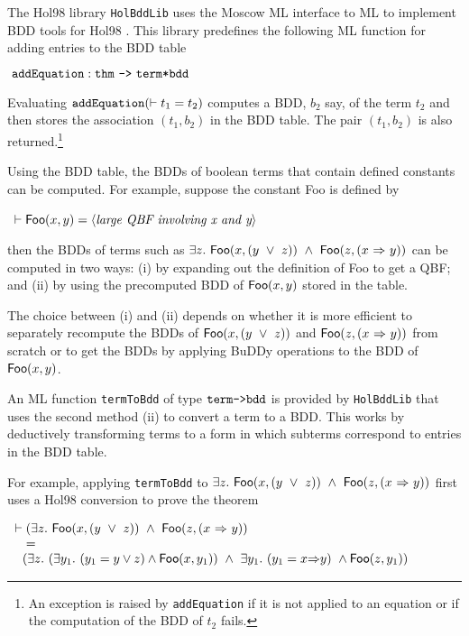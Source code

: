\documentclass[12pt]{article}
\newcommand{\bnind}[1]{\index[MLbn]{#1}}
\newcommand{\con}[1]{\mbox{\sf #1}}
\newcommand{\ty}[1]{\mbox{\tt #1}}
\newcommand{\ml}[1]{{\tt #1}}
\newcommand\Hol{Hol98\xspace}
\newcommand{\Buddy}{BuDDy\xspace}
\newcommand\fun{\mbox{\tt{->}}}
\newcommand\imp{{\Rightarrow}}
\renewcommand{\prod}{\mbox{\tt{*}}}
\begin{document}
The \Hol{} library \texttt{HolBddLib}  uses the Moscow ML interface to ML
to implement BDD tools for \Hol{} \cite{GordonLarsen}.
This library predefines the following ML function for adding
entries to the BDD table

\smallskip

$~\ml{addEquation} : \ty{thm}~\fun~\ty{term}\prod\ty{bdd}$\bnind{\ml{addEquation}}

\smallskip

\noindent Evaluating $\ml{addEquation}(\vdash t_1 = t_2)$ computes a
BDD, $b_2$ say, of the term $t_2$ and then stores the association
$(t_1,b_2)$ in the BDD table. The pair $(t_1,b_2)$ is also
returned.\footnote{An exception is raised by \ml{addEquation} if it is
not applied to an equation or if the computation of the BDD of $t_2$
fails.}

Using the BDD table, the BDDs of boolean terms that contain defined constants
can be computed. For example, suppose the constant \con{Foo} is defined by

\smallskip

~$\vdash \con{Foo}(x,y) = \langle\mbox{\it{large QBF involving x and y}}\rangle$

\smallskip

\noindent then the BDDs of terms such as 
$\exists z.~\con{Foo}(x,(y~\vee~z))~\wedge~\con{Foo}(z,(x~\imp~y))$
can be computed in two ways:
(i) by expanding out the definition of \con{Foo} to get a QBF;
and (ii) by using the precomputed BDD of $\con{Foo}(x,y)$ stored in the table.

The choice between (i) and (ii) depends on whether
it is more efficient to separately recompute the BDDs of $\con{Foo}(x,(y~\vee~z))$
and $\con{Foo}(z,(x~\imp~y))$ from scratch or to get the BDDs by
applying \Buddy{} operations to the BDD of $\con{Foo}(x,y)$. 

An ML function \ml{termToBdd}\bnind{\ml{termToBdd}} of type $\ty{term}\fun\ty{bdd}$ is
provided by \ml{HolBddLib} that uses the second method (ii) to convert
a term to a BDD.  This works by deductively transforming terms to a
form in which subterms correspond to entries in the BDD table.  

For
example, applying \ml{termToBdd} to $\exists
z.~\con{Foo}(x,(y~\vee~z))~\wedge~\con{Foo}(z,(x~\imp~y))$
first uses a \Hol{} conversion to prove the theorem

\smallskip
$\begin{array}{l}
\vdash (\exists z.~ \con{Foo}(x,(y~\vee~z))~\wedge~\con{Foo}(z,(x~\imp~y))\\
\phantom{\vdash} 
=\\
\phantom{\vdash}
 (\exists z.~(\exists y_1.~ (y_1 = y \vee z) \wedge \con{Foo}(x,y_1))
~\wedge~
\exists y_1.~(y_1 = x \imp y) ~\wedge \con{Foo}(z,y_1))
\end{array}$
\end{document}
